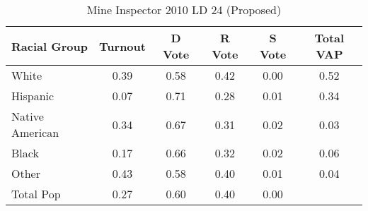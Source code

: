 \begin{table}[htb]
\begin{center}
\caption{Mine Inspector 2010 LD 24 (Proposed)}
\label{smine_vap_ld_24}
\begin{tabular}{lccccc}
  \hline
Racial Group & Turnout & D Vote & R Vote & S Vote & Total VAP \\ 
  \hline
White & 0.39 & 0.58 & 0.42 & 0.00 & 0.52 \\ 
  Hispanic & 0.07 & 0.71 & 0.28 & 0.01 & 0.34 \\ 
  Native American & 0.34 & 0.67 & 0.31 & 0.02 & 0.03 \\ 
  Black & 0.17 & 0.66 & 0.32 & 0.02 & 0.06 \\ 
  Other & 0.43 & 0.58 & 0.40 & 0.01 & 0.04 \\ 
  Total Pop & 0.27 & 0.60 & 0.40 & 0.00 &  \\ 
   \hline
\end{tabular}
\end{center}
\end{table}
